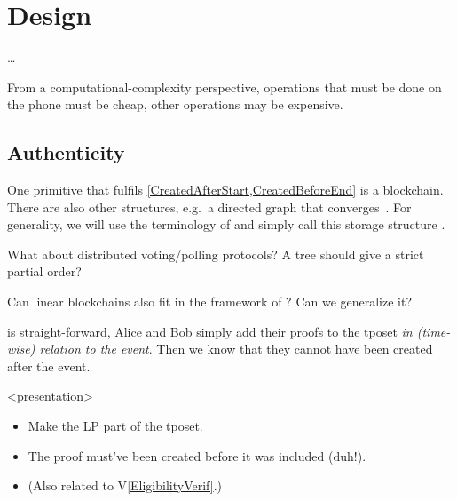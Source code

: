 \mode*

\section{Design}
\label{Design}

\dots

From a computational-complexity perspective, operations that must be done on 
the phone must be cheap, other operations may be expensive.

\subsection{Authenticity}

One primitive that fulfils \cref{CreatedAfterStart,CreatedBeforeEnd} is a 
blockchain.
There are also other structures, e.g.\ a directed graph that 
converges~\cite{BlockchainFreeCryptocurrencies}.
For generality, we will use the terminology of 
\textcite{BlockchainFreeCryptocurrencies} and simply call this storage 
structure .

\begin{frame}
  \begin{question}
    What about distributed voting/polling protocols?
    A tree should give a strict partial order?
  \end{question}
  \begin{question}
    Can linear blockchains also fit in the framework of 
    \textcite{BlockchainFreeCryptocurrencies}?
    Can we generalize it?
  \end{question}
\end{frame}

 is straight-forward, Alice and Bob simply add their 
proofs to the \ac{tposet} \emph{in (time-wise) relation to the event}.
Then we know that they cannot have been created after the event.

\begin{frame}<presentation>
  \begin{solution}
    \begin{itemize}
      \item Make the \ac{LP} part of the \ac{tposet}.
      \item The proof must've been created before it was included (duh!).
      \item (Also related to V\ref{EligibilityVerif}.)
    \end{itemize}
  \end{solution}
\end{frame}


